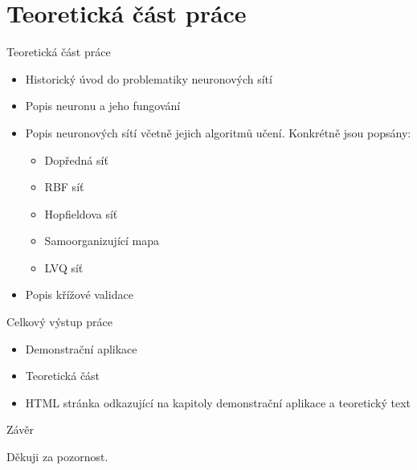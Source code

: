 \documentclass{beamer}
\begin{document}
\section{Teoretická část práce}
\begin{frame}{Teoretická část práce}
\begin{itemize}
\item Historický úvod do problematiky neuronových sítí
\item Popis neuronu a jeho fungování
\item Popis neuronových sítí včetně jejich algoritmů učení. Konkrétně jsou popsány:
\begin{itemize}
\item Dopředná síť
\item RBF síť
\item Hopfieldova síť
\item Samoorganizující mapa
\item LVQ síť
\end{itemize}
\item Popis křížové validace
\end{itemize}
\end{frame}
\begin{frame}{Celkový výstup práce}
\begin{itemize}
\item Demonstrační aplikace
\item Teoretická část
\item HTML stránka odkazující na kapitoly demonstrační aplikace a teoretický text
\end{itemize}
\end{frame}
\begin{frame}{Závěr}
\begin{center}
\begin{huge}
Děkuji za pozornost.
\end{huge}
\end{center}

\end{frame}
\end{document}
